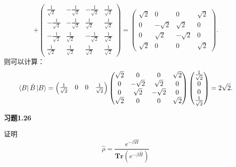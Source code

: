 \documentclass[reqno,a4paper,12pt]{amsart}
\begin{document}
\begin{tcolorbox}[breakable, colback = black!5!white, colframe = black]
\[	+ 
	\left( \begin{matrix}
		\frac{1}{\sqrt{2}} & -\frac{1}{\sqrt{2}} & -\frac{1}{\sqrt{2}} & \frac{1}{\sqrt{2}} \\
		-\frac{1}{\sqrt{2}} & -\frac{1}{\sqrt{2}} & \frac{1}{\sqrt{2}} & \frac{1}{\sqrt{2}} \\
		-\frac{1}{\sqrt{2}} & \frac{1}{\sqrt{2}} & -\frac{1}{\sqrt{2}} & \frac{1}{\sqrt{2}} \\
		\frac{1}{\sqrt{2}} & \frac{1}{\sqrt{2}} & \frac{1}{\sqrt{2}} & \frac{1}{\sqrt{2}}
	\end{matrix} \right) 
	= 
	\left( \begin{matrix}
		\sqrt{2} & 0 & 0 & \sqrt{2} \\
		0 & -\sqrt{2} & \sqrt{2} & 0 \\
		0 & \sqrt{2} & -\sqrt{2} & 0 \\
		\sqrt{2} & 0 & 0 & \sqrt{2}
	\end{matrix} \right).
\]
则可以计算：
\[
	\bra{B} \hat{B} \ket{B} = \left( \begin{matrix}
		\frac{1}{\sqrt{2}} & 0 & 0 & \frac{1}{\sqrt{2}}
	\end{matrix} \right)
	\left( \begin{matrix}
		\sqrt{2} & 0 & 0 & \sqrt{2} \\
		0 & -\sqrt{2} & \sqrt{2} & 0 \\
		0 & \sqrt{2} & -\sqrt{2} & 0 \\
		\sqrt{2} & 0 & 0 & \sqrt{2}
	\end{matrix} \right)
	\left( \begin{matrix}
		\frac{1}{\sqrt{2}} \\
		0 \\
		0 \\
		\frac{1}{\sqrt{2}}
	\end{matrix} \right) = 2\sqrt{2}.
\]
\end{tcolorbox}

\textbf{习题1.26}

证明
\[
	\hat{\rho} = \frac{e^{-\beta \hat{H}}}{\mathbf{Tr}(e^{-\beta \hat{H}})}
\]
\end{document}
